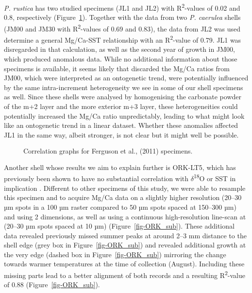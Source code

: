 \documentclass[
  authoryear,
  preprint,
  3p]{elsarticle}
\begin{document}
\emph{P. rustica} has two studied specimens (JL1 and JL2) with
R\textsuperscript{2}-values of 0.02 and 0.8, respectively
\citep{Ferguson2011-zl} (Figure~\ref{fig-Ferg}). Together with the data
from two \emph{P. caerulea} shells (JM00 and JM30 with
R\textsuperscript{2}-values of 0.69 and 0.83), the data from JL2 was
used determine a general Mg/Ca-SST relationship with an
R\textsuperscript{2}-value of 0.79. JL1 was disregarded in that
calculation, as well as the second year of growth in JM00, which
produced anomalous data. While no additional information about those
specimens is available, it seems likely that discarded the Mg/Ca ratios
from JM00, which were interpreted as an ontogenetic trend, were
potentially influenced by the same intra-increment heterogeneity we see
in some of our shell specimens as well. Since these shells were analysed
by homogenising the carbonate powder of the m+2 layer and the more
exterior m+3 layer, these heterogeneities could potentially increased
the Mg/Ca ratio unpredictably, leading to what might look like an
ontogenetic trend in a linear dataset. Whether these anomalies affected
JL1 in the same way, albeit stronger, is not clear but it might well be
possible.

\begin{figure}


\caption{\label{fig-Ferg}Correlation graphs for Ferguson et al., (2011)
specimens.}

\end{figure}%

Another shell whose results we aim to explain further is ORK-LT5, which
has previously been shown to have no substantial correlation with
\(\delta\)\textsuperscript{18}O or SST in implication
\citep{Graniero2017-io}. Different to other specimens of this study, we
were able to resample this specimen and to acquire Mg/Ca data on a
slightly higher resolution (20--30 µm spots in a 100 µm raster compared
to 50 µm spots spaced at 150--300 µm) and using 2 dimensions, as well as
using a continuous high-resolution line-scan at (20--30 µm spots spaced
at 10 µm) (Figure~\ref{fig-ORK_sub}). These additional data revealed
previously missed summer peaks at around 2--3 mm distance to the shell
edge (grey box in Figure~\ref{fig-ORK_sub}) and revealed additional
growth at the very edge (dashed box in Figure~\ref{fig-ORK_sub})
mirroring the change towards warmer temperatures at the time of
collection (August). Including these missing parts lead to a better
alignment of both records and a resulting R\textsuperscript{2}-value of
0.88 (Figure~\ref{fig-ORK_sub}).
\end{document}
